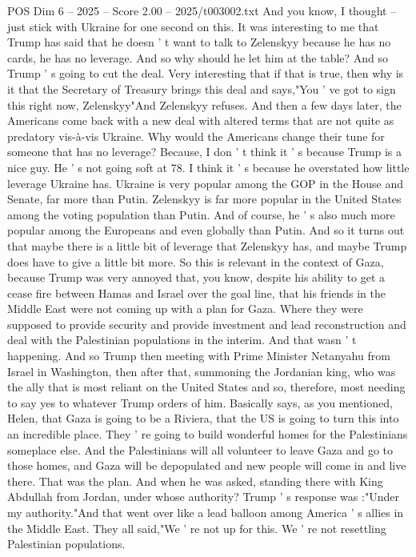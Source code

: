 \begin{textsample}{POS Dim 6 – 2025 – Score 2.00 – 2025/t003002.txt}
And you know, I thought -- just stick with Ukraine for one second on this.
It was interesting to me that Trump has said that he doesn ' t want to talk to Zelenskyy because he has no cards, he has no leverage.
And so why should he let him at the table?
And so Trump ' s going to cut the deal.
Very interesting that if that is true, then why is it that the Secretary of Treasury brings this deal and says,"You ' ve got to sign this right now, Zelenskyy"And Zelenskyy refuses.
And then a few days later, the Americans come back with a new deal with altered terms that are not quite as predatory vis-à-vis Ukraine.
Why would the Americans change their tune for someone that has no leverage?
Because, I don ' t think it ' s because Trump is a nice guy.
He ' s not going soft at 78.
I think it ' s because he overstated how little leverage Ukraine has.
Ukraine is very popular among the GOP in the House and Senate, far more than Putin.
Zelenskyy is far more popular in the United States among the voting population than Putin.
And of course, he ' s also much more popular among the Europeans and even globally than Putin.
And so it turns out that maybe there is a little bit of leverage that Zelenskyy has, and maybe Trump does have to give a little bit more.
So this is relevant in the context of Gaza, because Trump was very annoyed that, you know, despite his ability to get a cease fire between Hamas and Israel over the goal line, that his friends in the Middle East were not coming up with a plan for Gaza.
Where they were supposed to provide security and provide investment and lead reconstruction and deal with the Palestinian populations in the interim.
And that wasn ' t happening.
And so Trump then meeting with Prime Minister Netanyahu from Israel in Washington, then after that, summoning the Jordanian king, who was the ally that is most reliant on the United States and so, therefore, most needing to say yes to whatever Trump orders of him.
Basically says, as you mentioned, Helen, that Gaza is going to be a Riviera, that the US is going to turn this into an incredible place.
They ' re going to build wonderful homes for the Palestinians someplace else.
And the Palestinians will all volunteer to leave Gaza and go to those homes, and Gaza will be depopulated and new people will come in and live there.
That was the plan.
And when he was asked, standing there with King Abdullah from Jordan, under whose authority?
Trump ' s response was :"Under my authority."And that went over like a lead balloon among America ' s allies in the Middle East.
They all said,"We ' re not up for this.
We ' re not resettling Palestinian populations.

\end{textsample}
